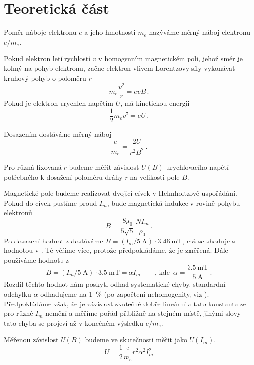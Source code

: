 \section*{Teoretická část}
Poměr náboje elektronu $e$ a jeho hmotnosti $m_e$ nazýváme měrný náboj elektronu $e/m_e$.

Pokud elektron letí rychlostí $v$ v homogenním magnetickém poli, jehož směr je kolmý na pohyb elektronu, začne elektron vlivem Lorentzovy síly vykonávat kruhový pohyb o poloměru $r$
\begin{equation} 
m_e  \frac{v^2}{r} = evB \,.
\end{equation}
Pokud je elektron urychlen napětím $U$, má kinetickou energii
\begin{equation}
\frac{1}{2}m_e v^2 = eU \,.
\end{equation}

Dosazením dostáváme měrný náboj \cite{skripta}
\begin{equation} \label{e:mernynaboj}
\frac{e}{m_e} = \frac{2U}{r^2 B^2} \,.
\end{equation}

Pro různá fixovaná $r$ budeme měřit závislost $U(B)$ urychlovacího napětí potřebného k dosažení poloměru dráhy $r$ na velikosti pole $B$.

Magnetické pole budeme realizovat dvojicí cívek v Helmholtzově uspořádání. Pokud do cívek pustíme proud $I_m$, bude magnetická indukce v rovině pohybu elektronů
\begin{equation}
B=\frac{8\mu_0}{5\sqrt{5}} \frac{N I_m}{\rho_0} \,.
\end{equation}
Po dosazení hodnot z \cite{skripta} dostáváme 
$B=(I_m/\SI{5}{\ampere}) \cdot \SI{3.46}{\milli\tesla}$, což se shoduje s hodnotou v \cite{skripta}. Té věříme více, protože předpokládáme, že je změřená.
Dále používáme hodnotu z \cite{skripta}
\begin{equation}
B=(I_m/\SI{5}{\ampere}) \cdot \SI{3.5}{\milli\tesla} = \alpha I_m \qquad \text{, kde }\, \alpha=\frac{\SI{3.5}{\milli\tesla}}{\SI{5}{\ampere}} \,.
\end{equation}
Rozdíl těchto hodnot nám poskytl odhad systematické chyby, standardní odchylku $\alpha$ odhadujeme na \SI{1}{\percent} (po započtení nehomogenity, viz \cite{skripta}). Předpokládáme však, že je závislost skutečně dobře lineární a tato konstanta se pro různé $I_m$ nemění a měříme pořád přibližně na stejném místě, jinými slovy tato chyba se projeví až v konečném výsledku $e/m_e$.

Měřenou závislost $U(B)$ budeme ve skutečnosti měřit jako $U(I_m)$.
\begin{equation} \label{e:zavislost}
U=\frac{1}{2} \frac{e}{m_e} r^2 \alpha^2 I_m^2
\end{equation}